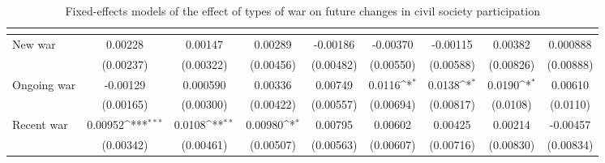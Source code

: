 \begin{table}[htbp]\centering
\def\sym#1{\ifmmode^{#1}\else\(^{#1}\)\fi}
\caption{Fixed-effects models of the effect of types of war on future changes in civil society participation \label{fecivilparticip}}
\begin{tabular}{l*{8}{c}}
\hline\hline
                    &&&&&&&&\\
\hline
New war                &     0.00228         &     0.00147         &     0.00289         &    -0.00186         &    -0.00370         &    -0.00115         &     0.00382         &    0.000888         \\
                    &   (0.00237)         &   (0.00322)         &   (0.00456)         &   (0.00482)         &   (0.00550)         &   (0.00588)         &   (0.00826)         &   (0.00888)         \\
[1em]
Ongoing war           &    -0.00129         &    0.000590         &     0.00336         &     0.00749         &      0.0116\sym{*}  &      0.0138\sym{*}  &      0.0190\sym{*}  &     0.00610         \\
                    &   (0.00165)         &   (0.00300)         &   (0.00422)         &   (0.00557)         &   (0.00694)         &   (0.00817)         &    (0.0108)         &    (0.0110)         \\
[1em]
Recent war          &     0.00952\sym{***}&      0.0108\sym{**} &     0.00980\sym{*}  &     0.00795         &     0.00602         &     0.00425         &     0.00214         &    -0.00457         \\
                    &   (0.00342)         &   (0.00461)         &   (0.00507)         &   (0.00563)         &   (0.00607)         &   (0.00716)         &   (0.00830)         &   (0.00834)         \\
[1em]

\end{tabular}
\end{table}
